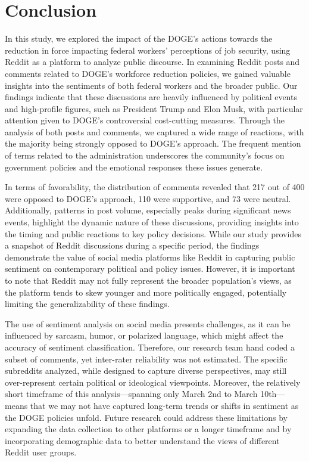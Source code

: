 \documentclass[
  12pt]{article}
\begin{document}
\section{Conclusion}\label{conclusion}

In this study, we explored the impact of the DOGE's actions towards the
reduction in force impacting federal workers' perceptions of job
security, using Reddit as a platform to analyze public discourse. In
examining Reddit posts and comments related to DOGE's workforce
reduction policies, we gained valuable insights into the sentiments of
both federal workers and the broader public. Our findings indicate that
these discussions are heavily influenced by political events and
high-profile figures, such as President Trump and Elon Musk, with
particular attention given to DOGE's controversial cost-cutting
measures. Through the analysis of both posts and comments, we captured a
wide range of reactions, with the majority being strongly opposed to
DOGE's approach. The frequent mention of terms related to the
administration underscores the community's focus on government policies
and the emotional responses these issues generate.

In terms of favorability, the distribution of comments revealed that 217
out of 400 were opposed to DOGE's approach, 110 were supportive, and 73
were neutral. Additionally, patterns in post volume, especially peaks
during significant news events, highlight the dynamic nature of these
discussions, providing insights into the timing and public reactions to
key policy decisions. While our study provides a snapshot of Reddit
discussions during a specific period, the findings demonstrate the value
of social media platforms like Reddit in capturing public sentiment on
contemporary political and policy issues. However, it is important to
note that Reddit may not fully represent the broader population's views,
as the platform tends to skew younger and more politically engaged,
potentially limiting the generalizability of these findings.

The use of sentiment analysis on social media presents challenges, as it
can be influenced by sarcasm, humor, or polarized language, which might
affect the accuracy of sentiment classification. Therefore, our research
team hand coded a subset of comments, yet inter-rater reliability was
not estimated. The specific subreddits analyzed, while designed to
capture diverse perspectives, may still over-represent certain political
or ideological viewpoints. Moreover, the relatively short timeframe of
this analysis---spanning only March 2nd to March 10th---means that we
may not have captured long-term trends or shifts in sentiment as the
DOGE policies unfold. Future research could address these limitations by
expanding the data collection to other platforms or a longer timeframe
and by incorporating demographic data to better understand the views of
different Reddit user groups.
\end{document}
